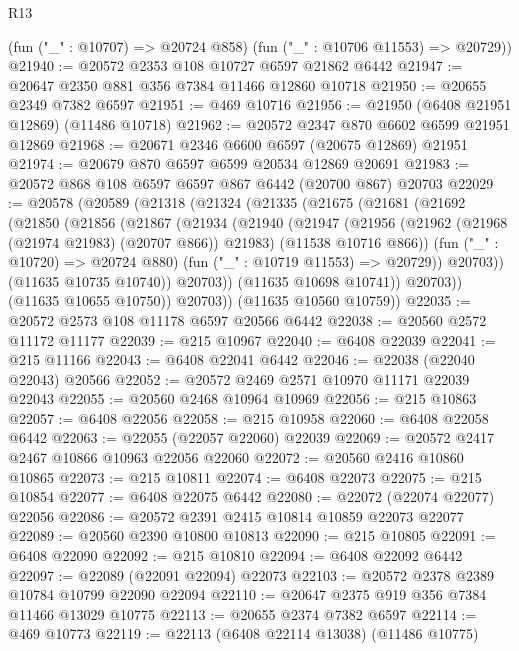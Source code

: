 \begin{lexlean}{R13}
\begin{coremodule}
      (fun ("_" : @10707) => @20724 @858)
      (fun ("_" : @10706 @11553) => @20729))
@21940 := @20572 @2353 @108 @10727 @6597 @21862 @6442
@21947 := @20647 @2350 @881 @356 @7384 @11466 @12860 @10718
@21950 := @20655 @2349 @7382 @6597
@21951 := @469 @10716
@21956 := @21950 (@6408 @21951 @12869) (@11486 @10718)
@21962 := @20572 @2347 @870 @6602 @6599 @21951 @12869
@21968 := @20671 @2346 @6600 @6597 (@20675 @12869) @21951
@21974 := @20679 @870 @6597 @6599 @20534 @12869 @20691
@21983 := @20572 @868 @108 @6597 @6597 @867 @6442 (@20700 @867) @20703
@22029 := @20578
    (@20589
      (@21318
        (@21324
          (@21335
            (@21675
              (@21681
                (@21692
                  (@21850
                    (@21856
                      (@21867
                        (@21934
                          (@21940
                            (@21947
                              (@21956
                                (@21962 (@21968 (@21974 @21983) (@20707 @866)) @21983)
                                (@11538 @10716 @866))
                              (fun ("_" : @10720) => @20724 @880)
                              (fun ("_" : @10719 @11553) => @20729))
                            @20703))
                        (@11635 @10735 @10740))
                      @20703))
                  (@11635 @10698 @10741))
                @20703))
            (@11635 @10655 @10750))
          @20703))
      (@11635 @10560 @10759))
@22035 := @20572 @2573 @108 @11178 @6597 @20566 @6442
@22038 := @20560 @2572 @11172 @11177
@22039 := @215 @10967
@22040 := @6408 @22039
@22041 := @215 @11166
@22043 := @6408 @22041 @6442
@22046 := @22038 (@22040 @22043) @20566
@22052 := @20572 @2469 @2571 @10970 @11171 @22039 @22043
@22055 := @20560 @2468 @10964 @10969
@22056 := @215 @10863
@22057 := @6408 @22056
@22058 := @215 @10958
@22060 := @6408 @22058 @6442
@22063 := @22055 (@22057 @22060) @22039
@22069 := @20572 @2417 @2467 @10866 @10963 @22056 @22060
@22072 := @20560 @2416 @10860 @10865
@22073 := @215 @10811
@22074 := @6408 @22073
@22075 := @215 @10854
@22077 := @6408 @22075 @6442
@22080 := @22072 (@22074 @22077) @22056
@22086 := @20572 @2391 @2415 @10814 @10859 @22073 @22077
@22089 := @20560 @2390 @10800 @10813
@22090 := @215 @10805
@22091 := @6408 @22090
@22092 := @215 @10810
@22094 := @6408 @22092 @6442
@22097 := @22089 (@22091 @22094) @22073
@22103 := @20572 @2378 @2389 @10784 @10799 @22090 @22094
@22110 := @20647 @2375 @919 @356 @7384 @11466 @13029 @10775
@22113 := @20655 @2374 @7382 @6597
@22114 := @469 @10773
@22119 := @22113 (@6408 @22114 @13038) (@11486 @10775)

\end{coremodule}
\end{lexlean}
